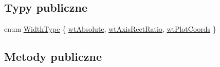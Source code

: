 \subsection*{Typy publiczne}
\begin{DoxyCompactItemize}
\item 
enum \hyperlink{class_q_c_p_bars_a65dbbf1ab41cbe993d71521096ed4649}{Width\+Type} \{ \hyperlink{class_q_c_p_bars_a65dbbf1ab41cbe993d71521096ed4649ab74315c9aa77df593c58dd25dfc0de35}{wt\+Absolute}, 
\hyperlink{class_q_c_p_bars_a65dbbf1ab41cbe993d71521096ed4649a90bc09899361ad3422ff277f7c790ffe}{wt\+Axis\+Rect\+Ratio}, 
\hyperlink{class_q_c_p_bars_a65dbbf1ab41cbe993d71521096ed4649aad3cc60ae1bfb1160a30237bee9eaf10}{wt\+Plot\+Coords}
 \}
\end{DoxyCompactItemize}
\subsection*{Metody publiczne}
